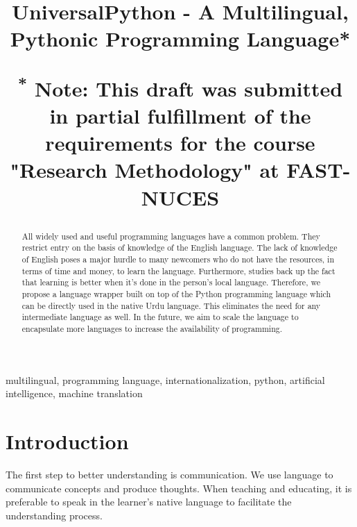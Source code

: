\documentclass[conference]{IEEEtran}
\begin{document}
\title{UniversalPython - A Multilingual, Pythonic Programming Language*\\
{\footnotesize \textsuperscript{*}
Note: This draft was submitted in partial fulfillment of the requirements for the course "Research Methodology"
at FAST-NUCES

}
}

\author{
}

\maketitle

\begin{abstract}
    All widely used and useful programming languages have a common problem. They restrict entry on the basis of knowledge of the English language. The lack of knowledge of English poses a major hurdle to many newcomers who do not have the resources, in terms of time and money, to learn the language. Furthermore, studies back up the fact that learning is better when it’s done in the person’s local language. Therefore, we propose a language wrapper built on top of the Python programming language which can be directly used in the native Urdu language. This eliminates the need for any intermediate language as well. In the future, we aim to scale the language to encapsulate more languages to increase the availability of programming.
\end{abstract}

\begin{IEEEkeywords}
multilingual, programming language, internationalization, python, artificial intelligence, machine translation
\end{IEEEkeywords}

\section{Introduction}

The first step to better understanding is communication. We use language to communicate concepts and produce thoughts. When teaching and educating, it is preferable to speak in the learner's native language to facilitate the understanding process.
\end{document}
